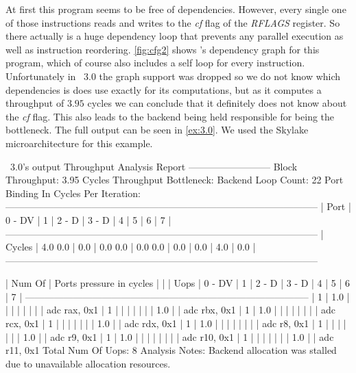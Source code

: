 \FloatBarrier

At first this program seems to be free of dependencies. However, every single one of those instructions reads and writes to the \emph{cf} flag of the \emph{RFLAGS} register. So there actually is a huge dependency loop that prevents any parallel execution as well as instruction reordering. \autoref{fig:cfg2} shows \suaca's dependency graph for this program, which of course also includes a self loop for every instruction.\\
Unfortunately in \iaca\ $3.0$ the graph support was dropped so we do not know which dependencies is does use exactly for its computations, but as it computes a throughput of $3.95$ cycles we can conclude that it definitely does not know about the \emph{cf} flag. This also leads to the backend being held responsible for being the bottleneck. The full output can be seen in \autoref{ex:3.0}. We used the Skylake microarchitecture for this example. 

\begin{LabeledExample}{\iaca\ $3.0$'s output}{\label{ex:3.0}}
    Throughput Analysis Report
    --------------------------
    Block Throughput: 3.95 Cycles       Throughput Bottleneck: Backend
    Loop Count:  22
    Port Binding In Cycles Per Iteration:
    --------------------------------------------------------------------------------------------------
    |  Port  |   0   -  DV   |   1   |   2   -  D    |   3   -  D    |   4   |   5   |   6   |   7   |
    --------------------------------------------------------------------------------------------------
    | Cycles |  4.0     0.0  |  0.0  |  0.0     0.0  |  0.0     0.0  |  0.0  |  0.0  |  4.0  |  0.0  |
    --------------------------------------------------------------------------------------------------
    
    
    | Num Of   |                    Ports pressure in cycles                         |      |
    |  Uops    |  0  - DV    |  1   |  2  -  D    |  3  -  D    |  4   |  5   |  6   |  7   |
    -----------------------------------------------------------------------------------------
    |   1      | 1.0         |      |             |             |      |      |      |      | adc rax, 0x1
    |   1      |             |      |             |             |      |      | 1.0  |      | adc rbx, 0x1
    |   1      | 1.0         |      |             |             |      |      |      |      | adc rcx, 0x1
    |   1      |             |      |             |             |      |      | 1.0  |      | adc rdx, 0x1
    |   1      | 1.0         |      |             |             |      |      |      |      | adc r8, 0x1
    |   1      |             |      |             |             |      |      | 1.0  |      | adc r9, 0x1
    |   1      | 1.0         |      |             |             |      |      |      |      | adc r10, 0x1
    |   1      |             |      |             |             |      |      | 1.0  |      | adc r11, 0x1
    Total Num Of Uops: 8
    Analysis Notes:
    Backend allocation was stalled due to unavailable allocation resources.
\end{LabeledExample}

